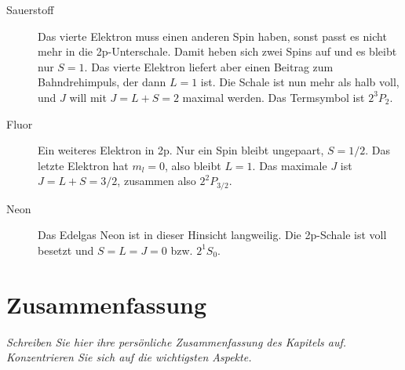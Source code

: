 \begin{description}
    \item[Sauerstoff] Das vierte Elektron muss einen anderen Spin haben, sonst passt es nicht mehr in die 2p-Unterschale. Damit heben sich zwei Spins auf und es bleibt nur $S=1$. Das vierte Elektron liefert aber einen Beitrag zum Bahndrehimpuls, der dann $L=1$ ist. Die Schale ist nun mehr als halb voll, und $J$ will mit $J=L+S=2$ maximal werden. Das Termsymbol ist $2^3P_2$.
    
    \item[Fluor] Ein weiteres Elektron in 2p. Nur ein Spin bleibt ungepaart, $S=1/2$. Das letzte Elektron hat $m_l = 0$, also bleibt $L=1$. Das maximale $J$ ist $J=L+S = 3/2$, zusammen also $2^2P_{3/2}$.
    
    \item[Neon] Das Edelgas Neon ist in dieser Hinsicht langweilig. Die 2p-Schale ist voll besetzt und $S = L = J = 0$ bzw. $2^1S_0$.   
\end{description}

\newpage

\section{Zusammenfassung}

\textit{Schreiben Sie hier ihre persönliche Zusammenfassung des Kapitels auf. Konzentrieren Sie sich auf die wichtigsten Aspekte.}

\vspace*{10cm}


\printbibliography[segment=\therefsegment,heading=subbibliography]
